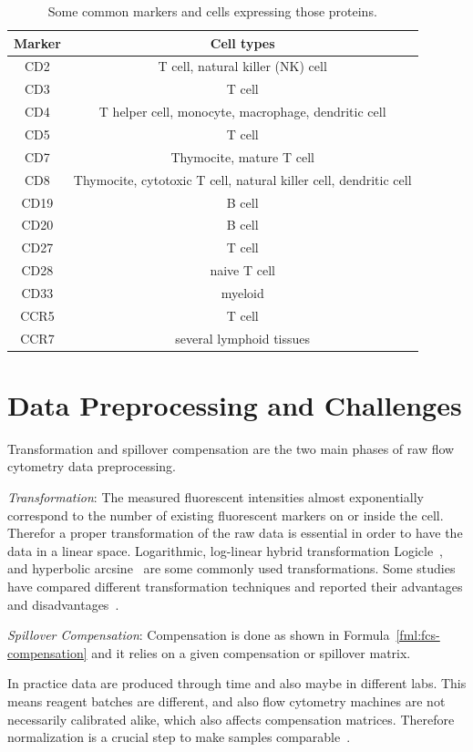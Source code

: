 \begin{table}
	\begin{tabular}{c|c}
	Marker & Cell types \\ \hline
	CD2 & T cell, natural killer (NK) cell \\
	CD3 & T cell \\
	CD4 & T helper cell, monocyte, macrophage, dendritic cell \\
	CD5 & T cell \\
	CD7 & Thymocite, mature T cell \\
	CD8 & Thymocite, cytotoxic T cell, natural killer cell, dendritic cell \\
	CD19 & B cell \\
	CD20 & B cell \\
	CD27 & T cell \\
	CD28 & naive T cell \\
	CD33 & myeloid \\
	CCR5 & T cell \\
	CCR7 & several lymphoid tissues
	\end{tabular}
	\caption{Some common markers and cells expressing those proteins.}
	\label{tbl:fcs:usual-markers}
\end{table}

\section{Data Preprocessing and Challenges}
Transformation and spillover compensation are the two main phases of raw flow cytometry data preprocessing.

\emph{Transformation}: The measured fluorescent intensities almost exponentially correspond to the number of existing fluorescent markers on or inside the cell. Therefor a proper transformation of the raw data is essential in order to have the data in a linear space. Logarithmic, log-linear hybrid transformation Logicle~\cite{fcs-logicle}, and hyperbolic arcsine~\cite{fcs-arcsineh} are some commonly used transformations. Some studies have compared different transformation techniques and reported their advantages and disadvantages~\cite{fcs-transformation-survey1, fcs-transformation-survey2}.

\emph{Spillover Compensation}: Compensation is done as shown in Formula~\ref{fml:fcs-compensation} and it relies on a given compensation or spillover matrix.

In practice data are produced through time and also maybe in different labs. This means reagent batches are different, and also flow cytometry machines are not necessarily calibrated alike, which also affects compensation matrices. Therefore normalization is a crucial step to make samples comparable~\cite{fcs-normalization}.

